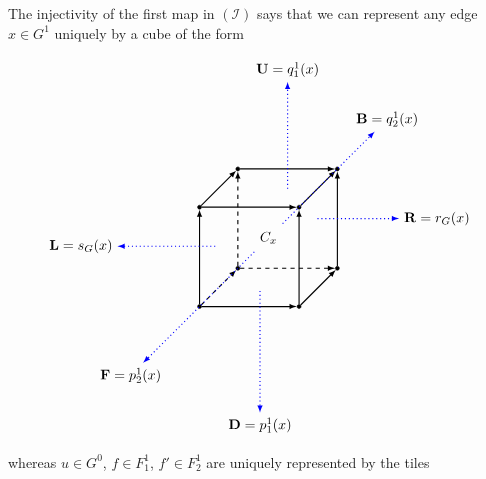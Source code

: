 \documentclass[a4paper,reqno,12pt]{amsart}
\theoremstyle{definition}
\theoremstyle{remark}
\begin{document}
The injectivity of the first map in $(\mathcal{I})$ says that we can represent any edge $x\in G^1$ uniquely by a cube of the form

\[
\begin{tikzpicture}[scale=2.5]
\node[inner sep=1pt, circle,draw,fill=black] (A1) at (0,0,0) {};
\node[inner sep=1pt, circle,draw,fill=black] (A2) at (1,0,0) {};
\node[inner sep=1pt, circle,draw,fill=black] (A3) at (1,0,1) {};
\node[inner sep=1pt, circle,draw,fill=black] (A4) at (0,0,1) {};

\node[inner sep=1pt, circle,draw,fill=black] (B1) at (0,1,0) {};
\node[inner sep=1pt, circle,draw,fill=black] (B2) at (1,1,0) {};
\node[inner sep=1pt, circle,draw,fill=black] (B3) at (1,1,1) {};
\node[inner sep=1pt, circle,draw,fill=black] (B4) at (0,1,1) {};

\path[->, black, >=latex,thick] (B4) edge [] node[]{} (B1);
\path[->, black, dashed, >=latex,thick] (A4) edge [] node[]{} (A1);
\path[->, black, >=latex,thick] (B3) edge [] node[]{} (B2);
\path[->, black, >=latex,thick] (A3) edge [] node[]{} (A2);

\path[->,black, dashed, >=latex,thick] (A1) edge [] node[]{} (B1);
\path[->,black, >=latex,thick] (A4) edge [] node[]{} (B4);
\path[->,black, >=latex,thick] (A2) edge [] node[]{} (B2);
\path[->,black, >=latex,thick] (A3) edge [] node[]{} (B3);

\path[->, black, >=latex,thick] (B1) edge [] node {} (B2);
\path[->, black, >=latex,thick] (B4) edge [] node {} (B3);
\path[->,black, dashed, >=latex,thick] (A1) edge [] node {} (A2);
\path[->, black, >=latex,thick] (A4) edge [] node {} (A3);

\node[] (L) at (-1,0.8,1.5) {$\mathbf{L}=s_G(x)$};
\node[] (R) at (2,0.5,0) {$\mathbf{R}=r_G(x)$};

\node[] (D) at (0.8,-1,1.5) {$\mathbf{D}=p_1^1(x)$};
\node[] (U) at (0.5,2,0) {$\mathbf{U}=q_1^1(x)$};

\node[] (F) at (-0.5,-0.5,1.5) {$\mathbf{F}=p_2^1(x)$};
\node[] (B) at (1.5,1.5,0) {$\mathbf{B}=q_2^1(x)$};

\node[] (A) at (0.4,0.8,1.5) {};
\node[] (K) at (0.75,0.5,0) {};

\node[] (C) at (0.8,0.4,1.5) {};
\node[] (G) at (0.5,0.75,0) {};

\node[] (E) at (0.6,0.6,1) {};
\node[] (H) at (0.4,0.4,0) {};

\node at (0.5,0.5,0.5) {$C_x$};

\path[->,blue, dotted, >=latex,thick] (A) edge [] node[]{} (L);
\path[->,blue, dotted, >=latex,thick] (K) edge [] node[]{} (R);
\path[->,blue, dotted, >=latex,thick] (C) edge [] node[]{} (D);
\path[->,blue, dotted, >=latex,thick] (G) edge [] node[]{} (U);
\path[->,blue, dotted, >=latex,thick] (E) edge [] node[]{} (F);
\path[->,blue, dotted, >=latex,thick] (H) edge [] node[]{} (B);
\end{tikzpicture}
\]
whereas $u\in G^0$, $f\in F_1^1$, $f'\in F_2^1$ are uniquely represented by the tiles 
\end{document}
